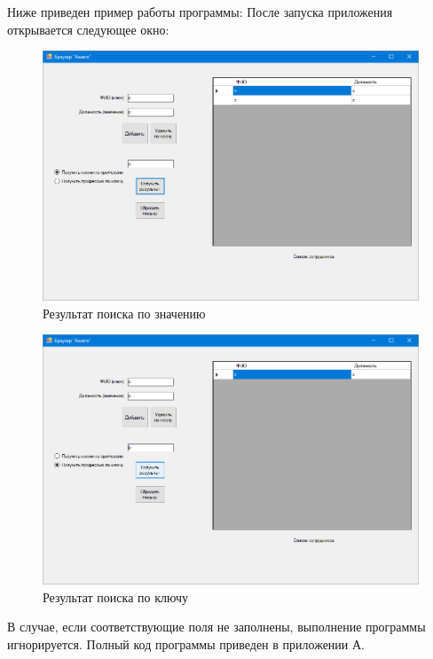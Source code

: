 Ниже приведен пример работы программы:
После запуска приложения открывается следующее окно:
\begin{figure}[H]
    \centering
    \includegraphics[scale=0.4]{task7/result4.png}
    \caption{Результат поиска по значению}
\end{figure}

\begin{figure}[H]
    \centering
    \includegraphics[scale=0.4]{task7/result5.png}
    \caption{Результат поиска по ключу}
\end{figure}

В случае, если соответствующие поля не заполнены, выполнение программы
игнорируется.
Полный код программы приведен в приложении А.


